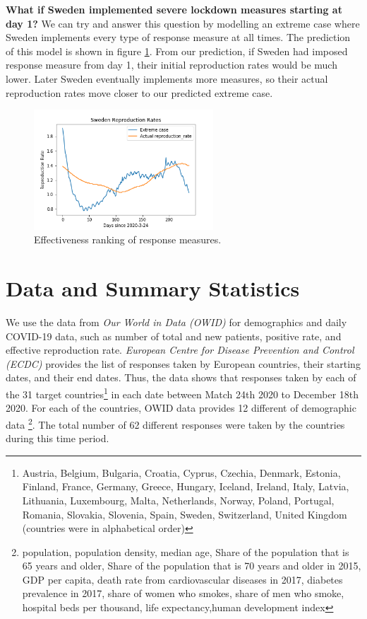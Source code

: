 \documentclass[11pt]{article}
\begin{document}
\textbf{What if Sweden implemented severe lockdown measures starting at day 1?} We can try and answer this question by modelling an extreme case where Sweden implements every type of response measure at all times. The prediction of this model is shown in figure \ref{fig:sweden_extreme_case}. From our prediction, if Sweden had imposed response measure from day 1, their initial reproduction rates would be much lower. Later Sweden eventually implements more measures, so their actual reproduction rates move closer to our predicted extreme case.

\begin{figure}[!h]
\centering
\includegraphics[width=0.6\textwidth]{test_country_predictions/sweden_extreme_case.png}
         \caption{Effectiveness ranking of response measures.}
         \label{fig:sweden_extreme_case}
\end{figure}

\section{Data and Summary Statistics}
We use the data from \textit{Our World in Data (OWID)} for demographics and daily COVID-19 data, such as number of total and new patients, positive rate, and effective reproduction rate. \textit{European Centre for Disease Prevention and Control (ECDC)} provides the list of responses taken by European countries, their starting dates, and their end dates. Thus, the data shows that responses taken by each of the 31 target countries\footnote{Austria, Belgium, Bulgaria, Croatia, Cyprus, Czechia, Denmark, Estonia, Finland, France, Germany, Greece, Hungary, Iceland, Ireland, Italy, Latvia, Lithuania, Luxembourg, Malta, Netherlands, Norway, Poland, Portugal, Romania, Slovakia, Slovenia, Spain, Sweden, Switzerland, United Kingdom (countries were in alphabetical order)} in each date between Match 24th 2020 to December 18th 2020. For each of the countries, OWID data provides 12 different of demographic data \footnote{population, population density, median age, Share of the population that is 65 years and older, Share of the population that is 70 years and older in 2015, GDP per capita, death rate from cardiovascular diseases in 2017, diabetes prevalence in 2017, share of women who smokes, share of men who smoke, hospital beds per thousand, life expectancy,human development index}. The total number of 62 different responses were taken by the countries during this time period.
\end{document}
